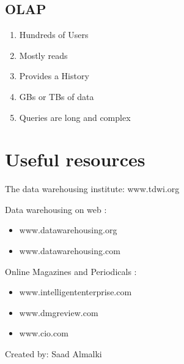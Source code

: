\documentclass[12pt]{article}
\begin{document}
\subsection{OLAP}

\begin{enumerate}

\item Hundreds of Users

\item Mostly reads

\item Provides a History

\item GBs or TBs of data

\item Queries are long and complex

\end{enumerate}


\section{Useful resources}

The data warehousing institute: www.tdwi.org

Data warehousing on web :

\begin{itemize}


\item www.datawarehousing.org
\item www.datawarehousing.com

\end{itemize}


Online Magazines and Periodicals :

\begin{itemize}


\item www.intelligententerprise.com
\item www.dmgreview.com
\item www.cio.com

\end{itemize}


\begin{flushright}
Created by: Saad Almalki \\
\end{flushright}
\end{document}

